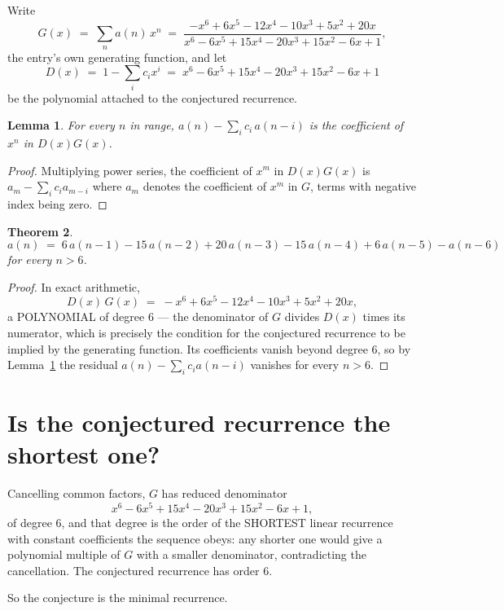 \documentclass[11pt,a4paper]{article}
\theoremstyle{plain}
\newtheorem{theorem}{Theorem}
\newtheorem{lemma}[theorem]{Lemma}
\theoremstyle{definition}
\begin{document}
Write
\[
G(x)\;=\;\sum_{n}a(n)\,x^{n}\;=\;\frac{- x^{6} + 6 x^{5} - 12 x^{4} - 10 x^{3} + 5 x^{2} + 20 x}{x^{6} - 6 x^{5} + 15 x^{4} - 20 x^{3} + 15 x^{2} - 6 x + 1},
\]
the entry's own generating function, and let
\[
D(x)\;=\;1-\sum_i c_i x^{i}\;=\;x^{6} - 6 x^{5} + 15 x^{4} - 20 x^{3} + 15 x^{2} - 6 x + 1
\]
be the polynomial attached to the conjectured recurrence.

\begin{lemma}\label{lem:key}
For every $n$ in range, $a(n)-\sum_i c_i\,a(n-i)$ is the coefficient of $x^{n}$ in
$D(x)G(x)$.
\end{lemma}

\begin{proof}
Multiplying power series, the coefficient of $x^{m}$ in $D(x)G(x)$ is
$a_m-\sum_i c_i a_{m-i}$ where $a_m$ denotes the coefficient of $x^{m}$ in $G$, terms with
negative index being zero.
\end{proof}

\begin{theorem}
\[
a(n)\;=\;6\,a(n-1) - 15\,a(n-2) + 20\,a(n-3) - 15\,a(n-4) + 6\,a(n-5) - a(n-6)
\]
for every $n>6$.
\end{theorem}

\begin{proof}
In exact arithmetic,
\[
D(x)\,G(x)\;=\;- x^{6} + 6 x^{5} - 12 x^{4} - 10 x^{3} + 5 x^{2} + 20 x,
\]
a POLYNOMIAL of degree $6$ --- the denominator of $G$ divides $D(x)$ times its numerator,
which is precisely the condition for the conjectured recurrence to be implied by the
generating function. Its coefficients vanish beyond degree $6$, so by
Lemma~\ref{lem:key} the residual $a(n)-\sum_ic_ia(n-i)$ vanishes for every
$n>6$.
\end{proof}

\section{Is the conjectured recurrence the shortest one?}

Cancelling common factors, $G$ has reduced denominator
\[
x^{6} - 6 x^{5} + 15 x^{4} - 20 x^{3} + 15 x^{2} - 6 x + 1,
\]
of degree $6$, and that degree is the order of the SHORTEST linear recurrence with
constant coefficients the sequence obeys: any shorter one would give a polynomial multiple of
$G$ with a smaller denominator, contradicting the cancellation. The conjectured recurrence has
order $6$.

So the conjecture is the minimal recurrence.
\end{document}

